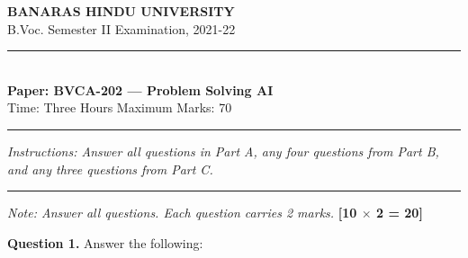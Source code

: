 \documentclass[11pt,a4paper]{article}
\begin{document}
\begin{center}
  {\large\bfseries BANARAS HINDU UNIVERSITY}\\[2pt]
  {\normalsize B.Voc. Semester II Examination, 2021-22}\\[6pt]
  \rule{0.8\linewidth}{0.5pt}\\[6pt]
  {\large\bfseries Paper: BVCA-202 --- Problem Solving AI}\\[4pt]
  {\normalsize Time: Three Hours \hfill Maximum Marks: 70}
\end{center}

\rule{\linewidth}{0.4pt}

\smallskip
\smallskip



\noindent   \textit{Instructions: Answer all questions in Part A, any four questions from Part B, and any three questions from Part C.}

\bigskip

\bigskip


\rule{\linewidth}{0.4pt}\smallskip




\noindent   \textit{Note: Answer all questions. Each question carries 2 marks.} \hfill   \textbf{[10 $ \times$ 2 = 20]}

\medskip


\noindent   \textbf{Question 1.} Answer the following:
\end{document}
